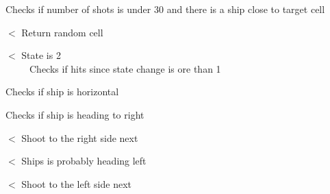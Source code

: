 Checks if number of shots is under 30 and there is a ship close to target cell

$<$ Return random cell

$<$ State is 2 ~\newline
~\newline
~\newline
~\newline
~\newline
~\newline
~\newline
~\newline
~\newline
~\newline
~\newline
~\newline
~\newline
~\newline
~\newline
~\newline
~\newline
~\newline
~\newline
~\newline
~\newline
~\newline
~\newline
~\newline
~\newline
~\newline
~\newline
~\newline
~\newline
~\newline
~\newline
~\newline
~\newline
~\newline
~\newline
~\newline
~\newline
~\newline
~\newline
 Checks if hits since state change is ore than 1

Checks if ship is horizontal

Checks if ship is heading to right

$<$ Shoot to the right side next

$<$ Ships is probably heading left

$<$ Shoot to the left side next


